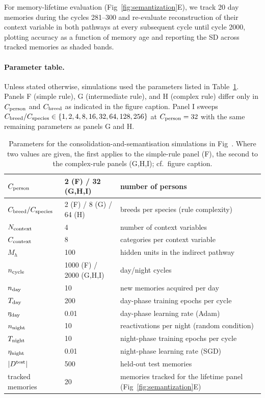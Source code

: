 For memory-lifetime evaluation (Fig~\ref{fig:semantization}E), we track 20
day memories during the cycles 281--300 and re-evaluate reconstruction of
their context variable in both pathways at every subsequent cycle until
cycle 2000, plotting accuracy as a function of memory age and reporting
the SD across tracked memories as shaded bands.

\paragraph{Parameter table.}
Unless stated otherwise, simulations used the parameters listed in
Table~\ref{tab:semantization}. Panels F (simple rule),
G (intermediate rule), and H (complex rule) differ only in
$C_{\rm person}$ and $C_{\rm breed}$ as indicated in the figure caption.
Panel I sweeps $C_{\rm breed}/C_{\rm species}\in\{1,2,4,8,16,32,64,128,256\}$
at $C_{\rm person}=32$ with the same remaining parameters as panels G and H.

\begin{table}[!ht]
\centering
\renewcommand{\arraystretch}{1.2}
    \begin{tabularx}{\textwidth}{| l | l | X |}
      \hline
      $C_{\rm person}$ & 2 (F) / 32 (G,H,I) & number of persons \\ \hline
      $C_{\rm breed}/C_{\rm species}$ & 2 (F) / 8 (G) / 64 (H) & breeds per species (rule complexity) \\ \hline
      $N_{\rm context}$ & 4 & number of context variables \\ \hline
      $C_{\rm context}$ & 8 & categories per context variable \\ \hline
      $M_h$ & 100 & hidden units in the indirect pathway \\ \hline
      $n_{\rm cycle}$ & 1000 (F) / 2000 (G,H,I) & day/night cycles \\ \hline
      $n_{\rm day}$ & 10 & new memories acquired per day \\ \hline
      $T_{\rm day}$ & 200 & day-phase training epochs per cycle \\ \hline
      $\eta_{\rm day}$ & 0.01 & day-phase learning rate (Adam) \\ \hline
      $n_{\rm night}$ & 10 & reactivations per night (random condition) \\ \hline
      $T_{\rm night}$ & 10 & night-phase training epochs per cycle \\ \hline
      $\eta_{\rm night}$ & 0.01 & night-phase learning rate (SGD) \\ \hline
      $|D^{\rm test}|$ & 500 & held-out test memories \\ \hline
      tracked memories & 20 & memories tracked for the lifetime panel (Fig~\ref{fig:semantization}E) \\ \hline
    \end{tabularx}
\caption{Parameters for the consolidation-and-semantisation simulations in
Fig~\protect{\ref{fig:semantization}}. Where two values are given, the
first applies to the simple-rule panel (F), the second to the
complex-rule panels (G,H,I); cf.\ figure caption.}
\label{tab:semantization}
\end{table}

